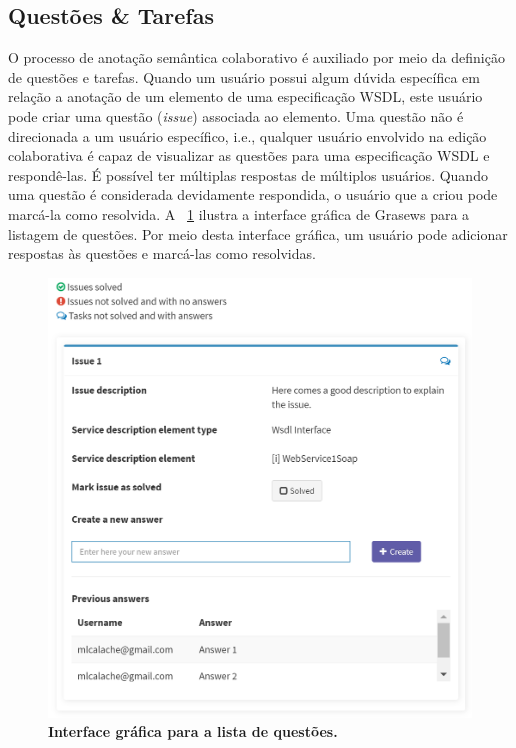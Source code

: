 \subsection{Questões \& Tarefas}

O processo de anotação semântica colaborativo é auxiliado por meio da definição de questões e tarefas. Quando um usuário possui algum dúvida específica em relação a anotação de um elemento de uma especificação WSDL, este usuário pode criar uma questão (\textit{issue}) associada ao elemento. Uma questão não é direcionada a um usuário específico, i.e., qualquer usuário envolvido na edição colaborativa é capaz de visualizar as questões para uma especificação WSDL e respondê-las. É possível ter múltiplas respostas de múltiplos usuários. Quando uma questão é considerada devidamente respondida, o usuário que a criou pode marcá-la como resolvida. A \figurename~\ref{fig:grasews-lista-issues} ilustra a interface gráfica de Grasews para a listagem de questões. Por meio desta interface gráfica, um usuário pode adicionar respostas às questões e marcá-las como resolvidas.

\begin{figure}[h]
        \includegraphics[scale=0.25]{4-grasews/imagens/grasews-lista-issues.png}
    \centering
    \caption[Interface gráfica para a lista de questões]{\textbf{Interface gráfica para a lista de questões.}}
    \label{fig:grasews-lista-issues}
\end{figure}

